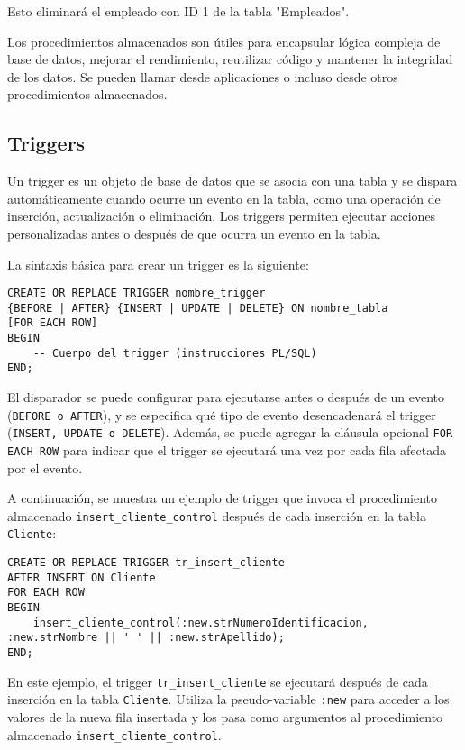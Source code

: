 \documentclass[executivepaper]{article}
\begin{document}
Esto eliminará el empleado con ID 1 de la tabla "Empleados".

Los procedimientos almacenados son útiles para encapsular lógica compleja de base de datos, mejorar el rendimiento, reutilizar código y mantener la integridad de los datos. Se pueden llamar desde aplicaciones o incluso desde otros procedimientos almacenados.

\subsection{Triggers}

Un trigger es un objeto de base de datos que se asocia con una tabla y se dispara automáticamente cuando ocurre un evento en la tabla, como una operación de inserción, actualización o eliminación. Los triggers permiten ejecutar acciones personalizadas antes o después de que ocurra un evento en la tabla.

La sintaxis básica para crear un trigger es la siguiente:

\begin{lstlisting}
CREATE OR REPLACE TRIGGER nombre_trigger
{BEFORE | AFTER} {INSERT | UPDATE | DELETE} ON nombre_tabla
[FOR EACH ROW]
BEGIN
    -- Cuerpo del trigger (instrucciones PL/SQL)
END;
\end{lstlisting}

El disparador se puede configurar para ejecutarse antes o después de un evento (\lstinline{BEFORE o AFTER}), y se especifica qué tipo de evento desencadenará el trigger (\lstinline{INSERT, UPDATE o DELETE}). Además, se puede agregar la cláusula opcional \lstinline{FOR EACH ROW} para indicar que el trigger se ejecutará una vez por cada fila afectada por el evento.

A continuación, se muestra un ejemplo de trigger que invoca el procedimiento almacenado \texttt{insert\_cliente\_control} después de cada inserción en la tabla \texttt{Cliente}:

\begin{lstlisting}
CREATE OR REPLACE TRIGGER tr_insert_cliente
AFTER INSERT ON Cliente
FOR EACH ROW
BEGIN
    insert_cliente_control(:new.strNumeroIdentificacion, :new.strNombre || ' ' || :new.strApellido);
END;
\end{lstlisting}

En este ejemplo, el trigger \texttt{tr\_insert\_cliente} se ejecutará después de cada inserción en la tabla \texttt{Cliente}. Utiliza la pseudo-variable \texttt{:new} para acceder a los valores de la nueva fila insertada y los pasa como argumentos al procedimiento almacenado \texttt{insert\_cliente\_control}.
\end{document}
